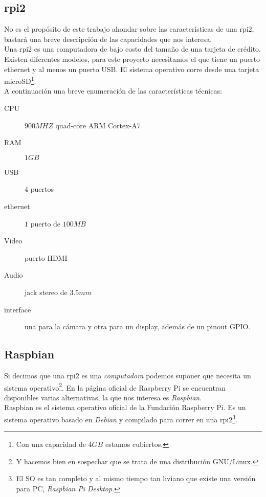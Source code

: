 \documentclass[10pt,a4paper]{article}
\begin{document}
\subsection{rpi2}

No es el prop\'osito de este trabajo ahondar sobre las caracter\'isticas de una rpi2, bastar\'a una breve descripci\'on de las capacidades que nos interesa.\\

Una rpi2 es una computadora de bajo costo del tama\~no de una tarjeta de cr\'edito. Existen diferentes modelos, para este proyecto necesitamos el que tiene un puerto ethernet y al menos un puerto USB. El sistema operativo corre desde una tarjeta microSD\footnote{Con una capacidad de $4 GB$ estamos cubiertos.}.\\

A continuaci\'on una breve enumeraci\'on de las caracter\'isticas t\'ecnicas:
\begin{description}
    \item[CPU] $900MHZ$ quad-core ARM Cortex-A7
    \item[RAM] $1GB$
    \item[USB] $4$ puertos
    \item[ethernet] $1$ puerto de $100MB$
    \item[Video] puerto HDMI
    \item[Audio] jack stereo de $3.5mm$
    \item[interface] una para la c\'amara y otra para un display, adem\'as de un pinout GPIO.
\end{description}

\subsection{Raspbian}

Si decimos que una rpi2 es una \emph{computadora} podemos suponer que necesita un sistema operativo\footnote{Y hacemos bien en sospechar que se trata de una distribuci\'on GNU/Linux.}. En la p\'agina oficial de Raspberry Pi se encuentran disponibles varias alternativas, la que nos interesa es \emph{Raspbian}.\\

Raspbian es el sistema operativo oficial de la Fundaci\'on Raspberry Pi. Es un sistema operativo basado en \emph{Debian} y compilado para correr en una rpi2\footnote{El SO es tan completo y al mismo tiempo tan liviano que existe una versi\'on para PC, \emph{Raspbian Pi Desktop}.}.\\
\end{document}
